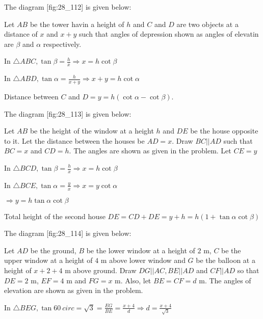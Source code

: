 \item The diagram [fig:28_112] is given below:

  \startplacefigure[reference=fig:28_112]
    \externalfigure[28_112.pdf]
  \stopplacefigure

  Let $AB$ be the tower havin a height of $h$ and $C$ and $D$ are two objects at a distance of $x$
  and $x + y$ such that angles of depression shown as angles of elevatin are $\beta$ and $\alpha$ respectively.

  In $\triangle ABC, \tan\beta = \frac{h}{x} \Rightarrow x = h\cot\beta$

  In $\triangle ABD, \tan\alpha = \frac{h}{x + y} \Rightarrow x + y = h\cot\alpha$

  Distance between $C$ and $D = y = h(\cot\alpha - \cot\beta)$.

\item The diagram [fig:28_113] is given below:

  \startplacefigure[reference=fig:28_113]
    \externalfigure[28_113.pdf]
  \stopplacefigure

  Let $AB$ be the height of the window at a height $h$ and $DE$ be the house opposite to it. Let the distance
  between the houses be $AD = x$. Draw $BC||AD$ such that $BC = x$ and $CD = h$. The angles are shown as
  given in the problem. Let $CE = y$

  In $\triangle BCD, \tan\beta = \frac{h}{x} \Rightarrow x = h\cot\beta$

  In $\triangle BCE, \tan\alpha = \frac{y}{x} \Rightarrow x = y\cot\alpha$

  $\Rightarrow y = h\tan\alpha\cot\beta$

  Total height of the second house $DE = CD + DE = y + h = h(1 + \tan\alpha\cot\beta)$

\item The diagram [fig:28_114] is given below:

  \startplacefigure[reference=fig:28_114]
    \externalfigure[28_114.pdf]
  \stopplacefigure

  Let $AD$ be the ground, $B$ be the lower window at a height of $2$ m, $C$ be the upper window at a
  height of $4$ m above lower window and $G$ be the balloon at a height of $x + 2 + 4$ m above ground. Draw
  $DG||AC, BE||AD$ and $CF||AD$ so that $DE = 2$ m, $EF = 4$ m and $FG = x$ m. Also, let $BE
  = CF = d$ m. The angles of elevation are shown as given in the problem.

  In $\triangle BEG, \tan60^\
  circ = \sqrt{3} = \frac{EG}{BE} = \frac{x + 4}{d}\Rightarrow d = \frac{x + 4}{\sqrt{3}}$

